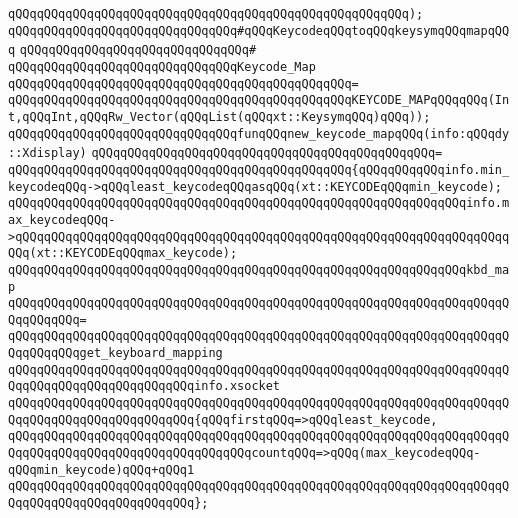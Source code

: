 \verb|qQQqqQQqqQQqqQQqqQQqqQQqqQQqqQQqqQQqqQQqqQQqqQQqqQQqqQQq);|\newline
\newline
\verb|qQQqqQQqqQQqqQQqqQQqqQQqqQQqqQQq#qQQqKeycodeqQQqtoqQQqkeysymqQQqmapqQQq|\newline
\verb|qQQqqQQqqQQqqQQqqQQqqQQqqQQqqQQq#|\newline
\verb|qQQqqQQqqQQqqQQqqQQqqQQqqQQqqQQqKeycode_Map|\newline
\verb|qQQqqQQqqQQqqQQqqQQqqQQqqQQqqQQqqQQqqQQqqQQqqQQq=|\newline
\verb|qQQqqQQqqQQqqQQqqQQqqQQqqQQqqQQqqQQqqQQqqQQqqQQqKEYCODE_MAPqQQqqQQq(Int,qQQqInt,qQQqRw_Vector(qQQqList(qQQqxt::KeysymqQQq)qQQq));|\newline
\newline
\verb|qQQqqQQqqQQqqQQqqQQqqQQqqQQqqQQqfunqQQqnew_keycode_mapqQQq(info:qQQqdy::Xdisplay)|\newline
\verb|qQQqqQQqqQQqqQQqqQQqqQQqqQQqqQQqqQQqqQQqqQQqqQQq=|\newline
\verb|qQQqqQQqqQQqqQQqqQQqqQQqqQQqqQQqqQQqqQQqqQQqqQQq{qQQqqQQqqQQqinfo.min_keycodeqQQq->qQQqleast_keycodeqQQqasqQQq(xt::KEYCODEqQQqmin_keycode);|\newline
\verb|qQQqqQQqqQQqqQQqqQQqqQQqqQQqqQQqqQQqqQQqqQQqqQQqqQQqqQQqqQQqqQQqinfo.max_keycodeqQQq->qQQqqQQqqQQqqQQqqQQqqQQqqQQqqQQqqQQqqQQqqQQqqQQqqQQqqQQqqQQqqQQqqQQqqQQq(xt::KEYCODEqQQqmax_keycode);|\newline
\newline
\verb|qQQqqQQqqQQqqQQqqQQqqQQqqQQqqQQqqQQqqQQqqQQqqQQqqQQqqQQqqQQqqQQqkbd_map|\newline
\verb|qQQqqQQqqQQqqQQqqQQqqQQqqQQqqQQqqQQqqQQqqQQqqQQqqQQqqQQqqQQqqQQqqQQqqQQqqQQqqQQq=|\newline
\verb|qQQqqQQqqQQqqQQqqQQqqQQqqQQqqQQqqQQqqQQqqQQqqQQqqQQqqQQqqQQqqQQqqQQqqQQqqQQqqQQqget_keyboard_mapping|\newline
\verb|qQQqqQQqqQQqqQQqqQQqqQQqqQQqqQQqqQQqqQQqqQQqqQQqqQQqqQQqqQQqqQQqqQQqqQQqqQQqqQQqqQQqqQQqqQQqqQQqinfo.xsocket|\newline
\verb|qQQqqQQqqQQqqQQqqQQqqQQqqQQqqQQqqQQqqQQqqQQqqQQqqQQqqQQqqQQqqQQqqQQqqQQqqQQqqQQqqQQqqQQqqQQqqQQq{qQQqfirstqQQq=>qQQqleast_keycode,|\newline
\verb|qQQqqQQqqQQqqQQqqQQqqQQqqQQqqQQqqQQqqQQqqQQqqQQqqQQqqQQqqQQqqQQqqQQqqQQqqQQqqQQqqQQqqQQqqQQqqQQqqQQqqQQqcountqQQq=>qQQq(max_keycodeqQQq-qQQqmin_keycode)qQQq+qQQq1|\newline
\verb|qQQqqQQqqQQqqQQqqQQqqQQqqQQqqQQqqQQqqQQqqQQqqQQqqQQqqQQqqQQqqQQqqQQqqQQqqQQqqQQqqQQqqQQqqQQqqQQq};|\newline
